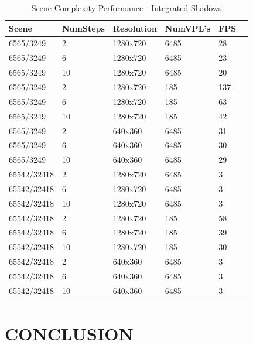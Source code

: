 \begin{table}[h!]
	\caption{Scene Complexity Performance - Integrated Shadows}
	\begin{center}
	    \begin{tabular}{ | l | l | l | l | l | l |}
	    \hline
	    Scene & NumSteps & Resolution & NumVPL's & FPS\\ \hline
	    6565/3249 & 2 & 1280x720 & 6485 & 28\\ \hline
	    6565/3249 & 6 & 1280x720 & 6485 & 23\\ \hline
	    6565/3249 & 10 & 1280x720 & 6485 & 20\\ \hline
	    6565/3249 & 2 & 1280x720 & 185 & 137\\ \hline
	    6565/3249 & 6 & 1280x720 & 185 & 63\\ \hline
	    6565/3249 & 10 & 1280x720 & 185 & 42\\ \hline
	    6565/3249 & 2 & 640x360 & 6485 & 31\\ \hline
	    6565/3249 & 6 & 640x360 & 6485 & 30\\ \hline
	    6565/3249 & 10 & 640x360 & 6485 & 29\\ \hline
	    \hline
	    \hline
	    65542/32418 & 2 & 1280x720 & 6485 & 3\\ \hline
	    65542/32418 & 6 & 1280x720 & 6485 & 3\\ \hline
	    65542/32418 & 10 & 1280x720 & 6485 & 3\\ \hline
	    65542/32418 & 2 & 1280x720 & 185 & 58\\ \hline
	    65542/32418 & 6 & 1280x720 & 185 & 39\\ \hline
	    65542/32418 & 10 & 1280x720 & 185 & 30\\ \hline
	    65542/32418 & 2 & 640x360 & 6485 & 3\\ \hline
	    65542/32418 & 6 & 640x360 & 6485 & 3\\ \hline
	    65542/32418 & 10 & 640x360 & 6485 & 3\\ \hline
	    \end{tabular}
	\end{center}
	\label{table:tech2Complex}
\end{table}

\section{CONCLUSION}
